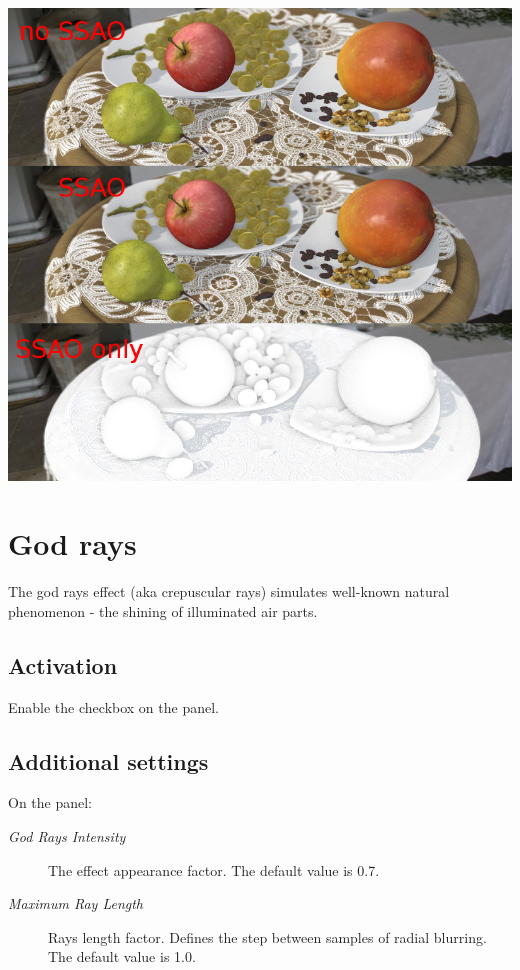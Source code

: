 \documentclass[a4paper,12pt,oneside]{sphinxmanual}
\begin{document}
{\hfill\includegraphics[width=1.000\linewidth]{ssao.jpg}\hfill}

\begin{DUlineblock}{0em}
\item[] 
\end{DUlineblock}


\section{God rays}
\label{postprocessing_effects:god-rays}\label{postprocessing_effects:id11}\label{postprocessing_effects:index-3}
The god rays effect (aka crepuscular rays) simulates well-known natural phenomenon - the shining of illuminated air parts.


\subsection{Activation}
\label{postprocessing_effects:id12}
Enable the  checkbox on the  panel.


\subsection{Additional settings}
\label{postprocessing_effects:id13}
On the  panel:
\begin{description}
\item[{\emph{God Rays Intensity}}] \leavevmode
The effect appearance factor. The default value is 0.7.

\item[{\emph{Maximum Ray Length}}] \leavevmode
Rays length factor. Defines the step between samples of radial blurring. The default value is 1.0.

\end{description}
\end{document}
